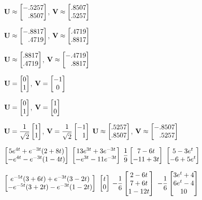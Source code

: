  $\mathbf{U}\approx\displaystyle{\begin{bmatrix}-.5257\\\phantom{-}.8507\end{bmatrix}}$,
$\mathbf{V}\approx\displaystyle{\begin{bmatrix}.8507\\.5257\end{bmatrix}}$

\smallskip
{}
 $\mathbf{U}\approx\displaystyle{\begin{bmatrix}-.8817\\\phantom{-}.4719\end{bmatrix}}$,
$\mathbf{V}\approx\displaystyle{\begin{bmatrix}.4719\\.8817\end{bmatrix}}$

 $\mathbf{U}\approx\displaystyle{\begin{bmatrix}.8817\\.4719\end{bmatrix}}$,
$\mathbf{V}\approx\displaystyle{\begin{bmatrix}-.4719\\\phantom{-}.8817\end{bmatrix}}$

\smallskip

 $\mathbf{U}=\displaystyle{\begin{bmatrix}0\\1\end{bmatrix}}$, $\mathbf{V}=\displaystyle{\begin{bmatrix}-1\\0\end{bmatrix}}$

$\mathbf{U}=\displaystyle{\begin{bmatrix}0\\1\end{bmatrix}}$, $\mathbf{V}=\displaystyle{\begin{bmatrix}1\\0\end{bmatrix}}$

\smallskip

 $\mathbf{U}=\displaystyle{\frac{1}{\sqrt2}\begin{bmatrix}1\\1\end{bmatrix}}$,
$\mathbf{V}=\displaystyle{\frac{1}{\sqrt2}\begin{bmatrix}-1\\\phantom{-}1\end{bmatrix}}$  \quad\;
 $\mathbf{U}\approx\displaystyle{\begin{bmatrix}.5257\\.8507\end{bmatrix}}$,
$\mathbf{V}\approx\displaystyle{\begin{bmatrix}-.8507\\\phantom{-}.5257\end{bmatrix}}$



 $\displaystyle{\begin{bmatrix}5e^{4t}+e^{-3t}(2+8t)\\
-e^{4t}-e^{-3t}(1-4t)\end{bmatrix}}$
 $\displaystyle{\begin{bmatrix}13e^{3t}+3e^{-3t}\\
-e^{3t}-11e^{-3t}\end{bmatrix}}$
 $\displaystyle{\frac{1}{9}\begin{bmatrix}7-6t\\
-11+3t\end{bmatrix}}$
 $\displaystyle{\begin{bmatrix}5-3e^t\\
-6+5e^t\end{bmatrix}}$

\smallskip

$\displaystyle{\begin{bmatrix}e^{-5t}(3+6t)+e^{-3t}(3-2t)\\
-e^{-5t}(3+2t)-e^{-3t}(1-2t)\end{bmatrix}}$
 $\displaystyle{\begin{bmatrix}t\\0
\end{bmatrix}}$
$\displaystyle{-\frac{1}{6}\begin{bmatrix}2-6t\\7+6t\\1-12t
\end{bmatrix}}$
$\displaystyle{-\frac{1}{6}\begin{bmatrix}3e^t+4\\6e^t-4\\10
\end{bmatrix}}$


